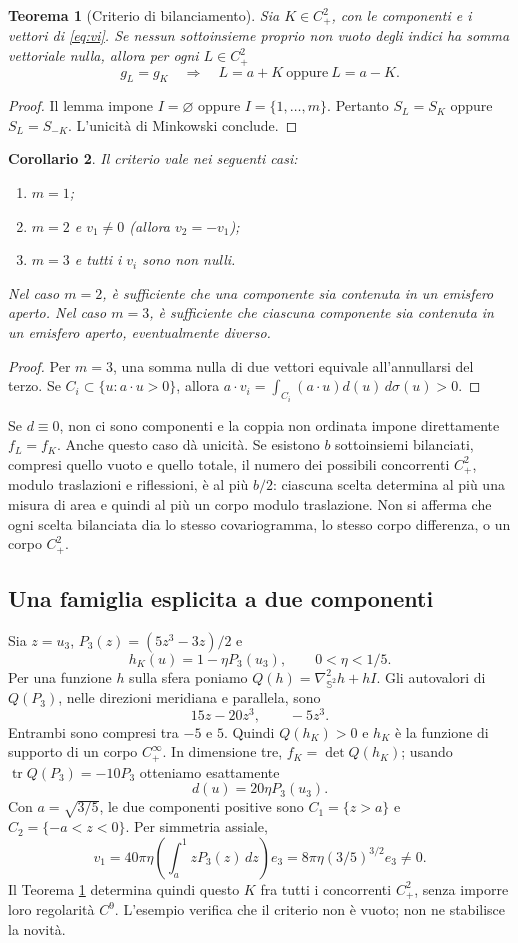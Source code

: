 \documentclass[11pt,a4paper]{article}
\newtheorem{theorem}{Teorema}
\newtheorem{corollary}[theorem]{Corollario}
\theoremstyle{remark}
\newcommand{\Sph}{\mathbb S^2}
\newcommand{\tr}{\operatorname{tr}}
\begin{document}
\begin{theorem}[Criterio di bilanciamento]\label{thm:balance}
Sia $K\in C^2_+$, con le componenti e i vettori di \eqref{eq:vi}.
Se nessun sottoinsieme proprio non vuoto degli indici ha somma vettoriale
nulla, allora per ogni $L\in C^2_+$
\[
g_L=g_K\quad\Longrightarrow\quad L=a+K\ \text{oppure}\ L=a-K.
\]
\end{theorem}
\begin{proof}
Il lemma impone $I=\varnothing$ oppure $I=\{1,\ldots,m\}$.
Pertanto $S_L=S_K$ oppure $S_L=S_{-K}$. L'unicità di Minkowski conclude.
\end{proof}

\begin{corollary}\label{cor:smallm}
Il criterio vale nei seguenti casi:
\begin{enumerate}
\item $m=1$;
\item $m=2$ e $v_1\ne0$ (allora $v_2=-v_1$);
\item $m=3$ e tutti i $v_i$ sono non nulli.
\end{enumerate}
Nel caso $m=2$, è sufficiente che una componente sia contenuta in un
emisfero aperto. Nel caso $m=3$, è sufficiente che ciascuna componente
sia contenuta in un emisfero aperto, eventualmente diverso.
\end{corollary}
\begin{proof}
Per $m=3$, una somma nulla di due vettori equivale all'annullarsi del terzo.
Se $C_i\subset\{u:a\cdot u>0\}$, allora
$a\cdot v_i=\int_{C_i}(a\cdot u)d(u)\,d\sigma(u)>0$.
\end{proof}

Se $d\equiv0$, non ci sono componenti e la coppia non ordinata impone
direttamente $f_L=f_K$. Anche questo caso dà unicità.
Se esistono $b$ sottoinsiemi bilanciati, compresi quello vuoto e quello
totale, il numero dei possibili concorrenti $C^2_+$, modulo traslazioni e
riflessioni, è al più $b/2$: ciascuna scelta determina al più una misura
di area e quindi al più un corpo modulo traslazione. Non si afferma che
ogni scelta bilanciata dia lo stesso covariogramma, lo stesso corpo
differenza, o un corpo $C^2_+$.

\subsection*{Una famiglia esplicita a due componenti}
Sia $z=u_3$, $P_3(z)=(5z^3-3z)/2$ e
\[
h_K(u)=1-\eta P_3(u_3),\qquad 0<\eta<1/5.
\]
Per una funzione $h$ sulla sfera poniamo $Q(h)=\nabla^2_{\Sph}h+hI$.
Gli autovalori di $Q(P_3)$, nelle direzioni meridiana e parallela, sono
\[
15z-20z^3,\qquad -5z^3.
\]
Entrambi sono compresi tra $-5$ e $5$. Quindi $Q(h_K)>0$ e $h_K$ è
la funzione di supporto di un corpo $C^\infty_+$. In dimensione tre,
$f_K=\det Q(h_K)$; usando $\tr Q(P_3)=-10P_3$ otteniamo esattamente
\[
d(u)=20\eta P_3(u_3).
\]
Con $a=\sqrt{3/5}$, le due componenti positive sono
$C_1=\{z>a\}$ e $C_2=\{-a<z<0\}$. Per simmetria assiale,
\[
v_1=40\pi\eta\left(\int_a^1 zP_3(z)\,dz\right)e_3
=8\pi\eta(3/5)^{3/2}e_3\ne0.
\]
Il Teorema \ref{thm:balance} determina quindi questo $K$ fra tutti i
concorrenti $C^2_+$, senza imporre loro regolarità $C^9$.
L'esempio verifica che il criterio non è vuoto; non ne stabilisce la novità.
\end{document}
